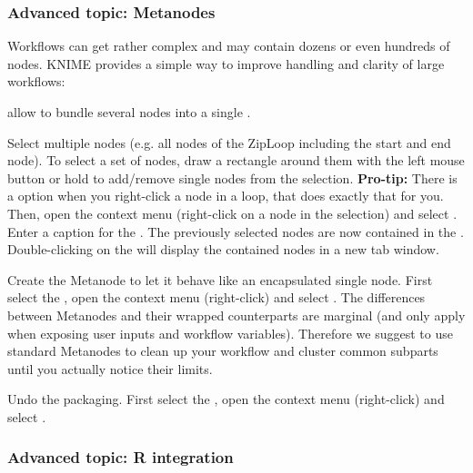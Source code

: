\subsubsection{Advanced topic: Metanodes}

Workflows can get rather complex and may contain dozens or even hundreds of nodes. KNIME provides a simple way to improve handling and clarity of large workflows:

 allow to bundle several nodes into a single .

\begin{task}
Select multiple nodes (e.g. all nodes of the ZipLoop including the start and end node). To select a set of nodes, draw a rectangle around them with the left mouse button or hold  to add/remove single nodes from the selection. \textbf{Pro-tip:} There is a  option when you right-click a node in a loop, that does exactly that for you. Then, open the context menu (right-click on a node in the selection) and select . Enter a caption for the . The previously selected nodes are now contained in the . Double-clicking on the  will display the contained nodes in a new tab window. 
\end{task}

\begin{task}
Create the Metanode to let it behave like an encapsulated single node. First select the , 
open the context menu (right-click) and select . The differences between Metanodes and their 
wrapped counterparts are marginal (and only apply when exposing user inputs and workflow variables). Therefore we 
suggest to use standard Metanodes to clean up your workflow and cluster common subparts until you actually notice 
their limits.
\end{task}

\begin{task}
Undo the packaging. First select the , open the context menu (right-click) and select .
\end{task}

\subsubsection{Advanced topic: R integration}

